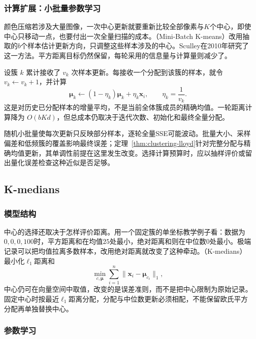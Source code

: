 \subsubsection{计算扩展：小批量参数学习}

颜色压缩若涉及大量图像，一次中心更新就要重新比较全部像素与$K$个中心，即使中心只移动一点，也要付出一次全量扫描的成本。（Mini-Batch K-means）改用抽取的$b$个样本估计更新方向，只调整这些样本涉及的中心。Sculley在2010年研究了这一方法。平方距离目标仍然保留，每轮采用的信息量与计算量则减少了。

设簇 $k$ 累计接收了 $v_k$ 次样本更新。每接收一个分配到该簇的样本，就令 $v_k\leftarrow v_k+1$，并计算
\begin{equation}
 \bm{\mu}_k\leftarrow
 (1-\eta_k)\bm{\mu}_k+\eta_k\bm{x}_i,
 \qquad \eta_k=\frac{1}{v_k}.
 \label{eq:clustering-minibatch}
\end{equation}
这是对历史已分配样本的增量平均，不是当前全体簇成员的精确均值。一轮距离计算降为 $O(bKd)$，但总成本仍取决于迭代次数、初始化和最终全量分配。

随机小批量使每次更新只反映部分样本，逐轮全量SSE可能波动。批量大小、采样偏差和低频簇的覆盖影响最终误差；定理~\ref{thm:clustering-lloyd}针对完整分配与精确均值更新，其单调性前提在这里发生改变。选择计算预算时，应以抽样评价或留出量化误差检查这种近似是否足够。
\subsection{K-medians}

\subsubsection{模型结构}

中心的选择还取决于怎样评价距离。用一个固定簇的单坐标教学例子看：数据为$0,0,0,100$时，平方距离和在均值$25$处最小，绝对距离和则在中位数$0$处最小。极端记录可以把均值拉离多数样本，改用绝对距离就改变了这种牵动。（K-medians）最小化$\ell_1$距离和
\[
 \min_{c,\bm\mu}\sum_{i=1}^n\lVert\bm{x}_i-\bm\mu_{c_i}\rVert_1,
\]
中心仍可在向量空间中取值，改变的是误差准则，而不是把中心限制为原始记录。固定中心时按最近$\ell_1$距离分配，分配与中位数更新必须相配，不能保留欧氏平方分配再单独替换中心。

\subsubsection{参数学习}

